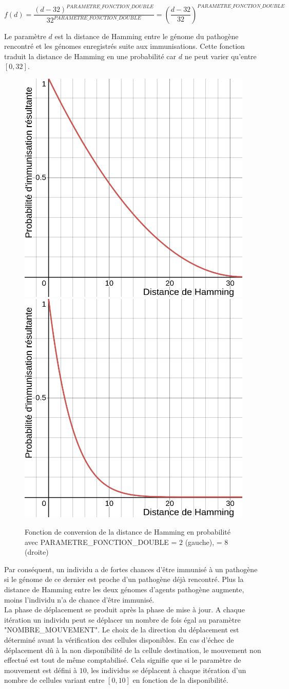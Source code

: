 $$
f(d) = \frac{(d-32)^{PARAMETRE\_FONCTION\_DOUBLE}}{32^{PARAMETRE\_FONCTION\_DOUBLE}} = (\frac{d-32}{32})^{PARAMETRE\_FONCTION\_DOUBLE}
$$

Le paramètre $d$ est la distance de Hamming entre le génome du pathogène rencontré et les génomes enregistrés suite aux immunisations. Cette fonction traduit la distance de Hamming en une probabilité car $d$ ne peut varier qu'entre $[0,32]$.

\newpage



\begin{figure}[h]
	\centering
	\captionsetup{justification=centering}
	\includegraphics[width=.4\textwidth]{Images/doubleHamming2.png}
  \hspace{1cm}
	\includegraphics[width=.4\textwidth]{Images/doubleHamming8.png}
	\caption[Fonction (double) de converstion en probabilité]{Fonction de conversion de la distance de Hamming en probabilité avec {\small PARAMETRE\_FONCTION\_DOUBLE} = $2$ (gauche), = $8$ (droite)}
\end{figure}

Par conséquent, un individu a de fortes chances d'être immunisé à un pathogène si le génome de ce dernier est proche d'un pathogène déjà rencontré. Plus la distance de Hamming entre les deux génomes d'agents pathogène augmente, moins l'individu n'a de chance d'être immunisé.\\

La phase de déplacement se produit après la phase de mise à jour. A chaque itération un individu peut se déplacer un nombre de fois égal au paramètre {\small "NOMBRE\_MOUVEMENT"}. Le choix de la direction du déplacement est déterminé avant la vérification des cellules disponibles. En cas d'échec de déplacement dû à la non disponibilité de la cellule destination, le mouvement non effectué est tout de même comptabilisé. Cela signifie que si le paramètre de mouvement est défini à $10$, les individus se déplacent à chaque itération d'un nombre de cellules variant entre $[0,10]$ en fonction de la disponibilité.\\

